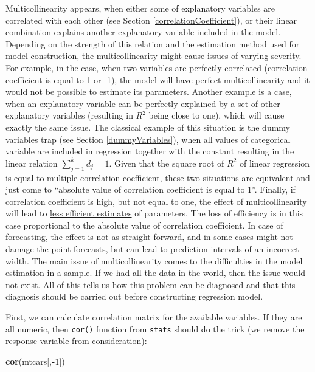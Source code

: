 \documentclass[
]{book}
\newenvironment{Shaded}{\begin{snugshade}}{\end{snugshade}}
\newcommand{\DecValTok}[1]{\textcolor[rgb]{0.00,0.00,0.81}{#1}}
\newcommand{\FunctionTok}[1]{\textcolor[rgb]{0.13,0.29,0.53}{\textbf{#1}}}
\newcommand{\NormalTok}[1]{#1}
\newcommand{\SpecialCharTok}[1]{\textcolor[rgb]{0.81,0.36,0.00}{\textbf{#1}}}
\theoremstyle{definition}
\theoremstyle{definition}
\theoremstyle{definition}
\theoremstyle{definition}
\theoremstyle{remark}
\begin{document}
Multicollinearity appears, when either some of explanatory variables are correlated with each other (see Section \ref{correlationCoefficient}), or their linear combination explains another explanatory variable included in the model. Depending on the strength of this relation and the estimation method used for model construction, the multicollinearity might cause issues of varying severity. For example, in the case, when two variables are perfectly correlated (correlation coefficient is equal to 1 or -1), the model will have perfect multicollinearity and it would not be possible to estimate its parameters. Another example is a case, when an explanatory variable can be perfectly explained by a set of other explanatory variables (resulting in \(R^2\) being close to one), which will cause exactly the same issue. The classical example of this situation is the dummy variables trap (see Section \ref{dummyVariables}), when all values of categorical variable are included in regression together with the constant resulting in the linear relation \(\sum_{j=1}^k d_j = 1\). Given that the square root of \(R^2\) of linear regression is equal to multiple correlation coefficient, these two situations are equivalent and just come to ``absolute value of correlation coefficient is equal to 1''. Finally, if correlation coefficient is high, but not equal to one, the effect of multicollinearity will lead to \hyperref[estimatesPropertiesEfficiency]{less efficient estimates} of parameters. The loss of efficiency is in this case proportional to the absolute value of correlation coefficient. In case of forecasting, the effect is not as straight forward, and in some cases might not damage the point forecasts, but can lead to prediction intervals of an incorrect width. The main issue of multicollinearity comes to the difficulties in the model estimation in a sample. If we had all the data in the world, then the issue would not exist. All of this tells us how this problem can be diagnosed and that this diagnosis should be carried out before constructing regression model.

First, we can calculate correlation matrix for the available variables. If they are all numeric, then \texttt{cor()} function from \texttt{stats} should do the trick (we remove the response variable from consideration):

\begin{Shaded}
\begin{Highlighting}[]
\FunctionTok{cor}\NormalTok{(mtcars[,}\SpecialCharTok{{-}}\DecValTok{1}\NormalTok{])}
\end{Highlighting}
\end{Shaded}
\end{document}
